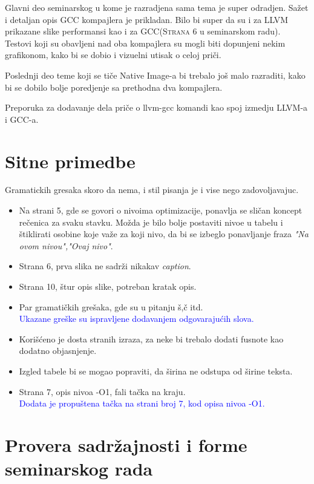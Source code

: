 \documentclass[a4paper]{report}
\newcommand{\odgovor}[1]{\textcolor{blue}{#1}}
\begin{document}
Glavni deo seminarskog u kome je razradjena sama tema je super odradjen. Sažet i detaljan opis GCC kompajlera je prikladan. Bilo bi super da su i za LLVM prikazane slike performansi kao i za GCC(\textsc{Strana 6} u seminarskom radu). Testovi koji su obavljeni nad oba kompajlera su mogli biti dopunjeni nekim grafikonom, kako bi se dobio i vizuelni utisak o celoj priči.

Poslednji deo teme koji se tiče Native Image-a bi trebalo još malo razraditi, kako bi se dobilo bolje poredjenje sa prethodna dva kompajlera. 

Preporuka za dodavanje dela priče o llvm-gcc komandi kao spoj izmedju LLVM-a i GCC-a.


\section{Sitne primedbe}
Gramatickih gresaka skoro da nema, i stil pisanja je i vise nego zadovoljavajuc.

\begin{itemize}
    \item Na strani 5, gde se govori o nivoima optimizacije, ponavlja se sličan koncept rečenica za svaku stavku. Možda je bilo bolje postaviti nivoe u tabelu i štiklirati osobine koje važe za koji nivo, da bi se izbeglo ponavljanje fraza \textit{"Na ovom nivou","Ovaj nivo"}.
    \item Strana 6, prva slika ne sadrži nikakav \textit{caption}.
    \item Strana 10, štur opis slike, potreban kratak opis.
    \item Par gramatičkih grešaka, gde su u pitanju š,č itd. \\
         \odgovor{Ukazane greške su ispravljene dodavanjem odgovarajućih slova.}
    \item Korišćeno je dosta stranih izraza, za neke bi trebalo dodati fusnote kao dodatno objasnjenje.
    \item Izgled tabele bi se mogao popraviti, da širina ne odstupa od širine teksta.
    \item Strana 7, opis nivoa -O1, fali tačka na kraju. \\
         \odgovor{Dodata je propuštena tačka na strani broj 7, kod opisa nivoa -O1.}
    
\end{itemize}


\section{Provera sadržajnosti i forme seminarskog rada}
\end{document}
